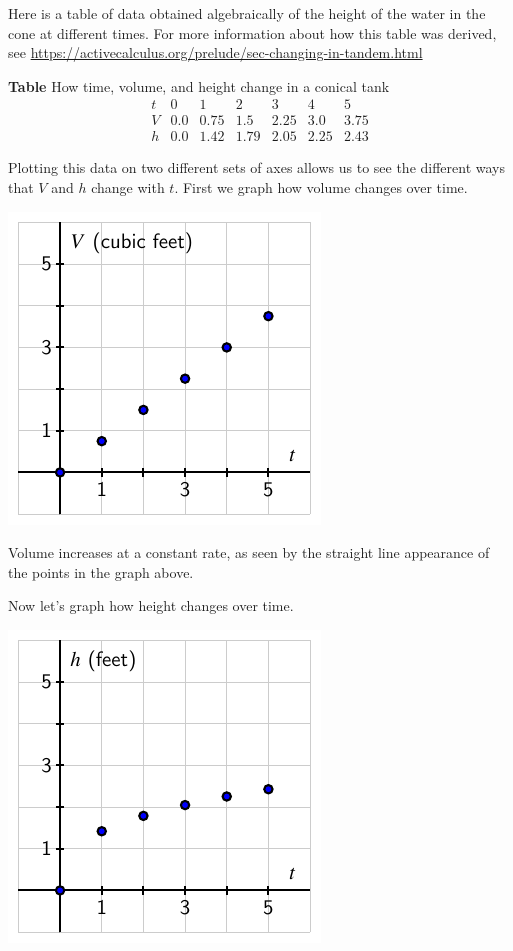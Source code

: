 \documentclass{ximera}
\begin{document}

Here is a table of data obtained algebraically of the height of the water in the cone at different times.  For more information about how this table was derived, see \url{https://activecalculus.org/prelude/sec-changing-in-tandem.html}

\begin{center}
\textbf{Table} How time, volume, and height change in a conical tank
$$
\begin{array}{lllllll}
t&0&1&2&3&4&5\\
\hline
V&0.0&0.75&1.5&2.25&3.0&3.75\\
\hline
h&0.0&1.42&1.79&2.05&2.25&2.43
\end{array}
$$
\end{center}


Plotting this data on two different sets of axes allows us to see the different ways that $V$ and $h$ change with $t$.  First we graph how volume changes over time.

\begin{image}
\includegraphics{tandem-cone-V-t.pdf}
\end{image}

Volume increases at a constant rate, as seen by the straight line appearance of the points in the graph above.  

Now let's graph how height changes over time.

\begin{image}
\includegraphics{tandem-cone-h-t.pdf}
\end{image}
\end{document}
